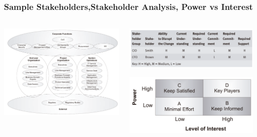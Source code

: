 \documentclass[aspectratio=169, table]{beamer}
\begin{document}
	{
		\begin{frame}
			\frametitle{Sample Stakeholders,Stakeholder Analysis, Power vs Interest}
			\framesubtitle{\hspace{1cm}}
			\begin{columns}
				\begin{column}{0.5\textwidth}
					\begin{center}
						\includegraphics[width=\textwidth]{../figures/sample_stakeholders}
					\end{center}
				\end{column}
				\begin{column}{0.5\textwidth}
					\begin{center}
						\includegraphics[width=\textwidth]{../figures/stakeholder_analysis}
					\end{center}
					\begin{center}
						\includegraphics[width=\textwidth]{../figures/power_vs_interest}
					\end{center}
				\end{column}
			\end{columns}

		\end{frame}
	}
\end{document}
